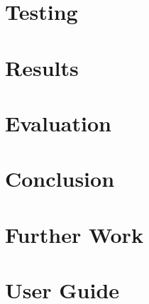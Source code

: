 \documentclass[12pt]{article}
\begin{document}
\section{Testing}

\section{Results}

\section{Evaluation}

\section{Conclusion}

\section{Further Work}

\section{User Guide}

\newpage
\appendix

% 


\end{document}
